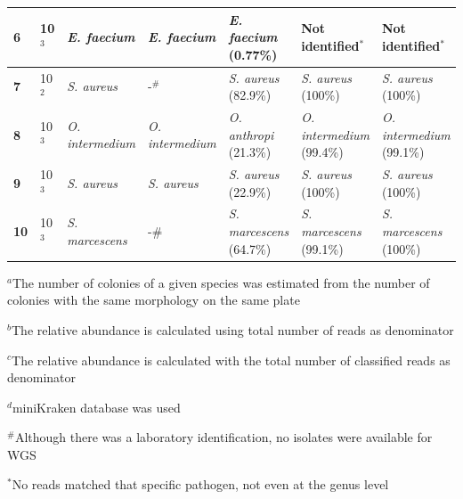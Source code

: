 \begin{table}[]
{\begin{tabular}{@{}|l|l|l|l|lll|@{}}
\textbf{6} &
  10$^3$ &
  \textit{E. faecium} &
  \textit{E. faecium} &
  \multicolumn{1}{l|}{\textit{E. faecium} (0.77\%)} &
  \multicolumn{1}{l|}{Not identified$^*$} &
  Not identified$^*$ \\ \midrule
\textbf{7} &
  10$^2$ &
  \textit{S. aureus} &
  -$^\#$ &
  \multicolumn{1}{l|}{\textit{S. aureus} (82.9\%)} &
  \multicolumn{1}{l|}{\textit{S. aureus} (100\%)} &
  \textit{S. aureus} (100\%) \\ \midrule
\textbf{8} &
  10$^3$ &
  \textit{O. intermedium} &
  \textit{O. intermedium} &
  \multicolumn{1}{l|}{\textit{O. anthropi} (21.3\%)} &
  \multicolumn{1}{l|}{\textit{O. intermedium} (99.4\%)} &
  \textit{O. intermedium} (99.1\%) \\ \midrule
\textbf{9} &
  10$^3$ &
  \textit{S. aureus} &
  \textit{S. aureus} &
  \multicolumn{1}{l|}{\textit{S. aureus} (22.9\%)} &
  \multicolumn{1}{l|}{\textit{S. aureus} (100\%)} &
  \textit{S. aureus} (100\%) \\ \midrule
\textbf{10} &
  10$^3$ &
  \textit{S. marcescens} &
  -\# &
  \multicolumn{1}{l|}{\textit{S. marcescens} (64.7\%)} &
  \multicolumn{1}{l|}{\textit{S. marcescens} (99.1\%)} &
  \textit{S. marcescens} (100\%) \\ \bottomrule
\end{tabular}%
}
\tiny
\item $^a$The number of colonies of a given species was estimated from the number of colonies with the same morphology on the same plate 
\item $^b$The relative abundance is calculated using total number of reads as denominator
\item $^c$The relative abundance is calculated with the total number of classified reads as denominator
\item $^d$miniKraken database was used
\item $^\#$Although there was a laboratory identification, no isolates were available for WGS
\item $^*$No reads matched that specific pathogen, not even at the genus level
\end{table}

